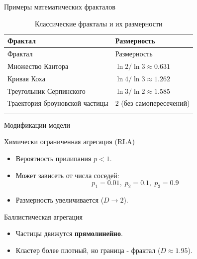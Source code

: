 \documentclass[
  ignorenonframetext,
  aspectratio=169,
  russian,
]{beamer}
\providecommand{\tightlist}{%
  \setlength{\itemsep}{0pt}\setlength{\parskip}{0pt}}
\begin{document}
\begin{frame}{Примеры математических фракталов}
\label{ux43fux440ux438ux43cux435ux440ux44b-ux43cux430ux442ux435ux43cux430ux442ux438ux447ux435ux441ux43aux438ux445-ux444ux440ux430ux43aux442ux430ux43bux43eux432}
\begin{longtable}[]{@{}ll@{}}
\caption{Классические фракталы и их
размерности}\label{tbl-classical-fractals}\tabularnewline
\toprule\noalign{}
Фрактал & Размерность \\
\midrule\noalign{}
\endfirsthead
\toprule\noalign{}
Фрактал & Размерность \\
\midrule\noalign{}
\endhead
Множество Кантора & \(\ln 2 / \ln 3 \approx 0.631\) \\
Кривая Коха & \(\ln 4 / \ln 3 \approx 1.262\) \\
Треугольник Серпинского & \(\ln 3 / \ln 2 \approx 1.585\) \\
Траектория броуновской частицы & \(2\) (без самопересечений) \\
\bottomrule\noalign{}
\end{longtable}
\end{frame}

\begin{frame}{Модификации модели}
\label{ux43cux43eux434ux438ux444ux438ux43aux430ux446ux438ux438-ux43cux43eux434ux435ux43bux438}
\begin{block}{Химически ограниченная агрегация (RLA)}
\label{ux445ux438ux43cux438ux447ux435ux441ux43aux438-ux43eux433ux440ux430ux43dux438ux447ux435ux43dux43dux430ux44f-ux430ux433ux440ux435ux433ux430ux446ux438ux44f-rla}
\begin{itemize}[<+->]
\tightlist
\item
  Вероятность прилипания \(p < 1\).
\item
  Может зависеть от числа соседей: \[
  p_1 = 0.01,\; p_2 = 0.1,\; p_3 = 0.9
  \]
\item
  Размерность увеличивается (\(D \to 2\)).
\end{itemize}
\end{block}

\begin{block}{Баллистическая агрегация}
\label{ux431ux430ux43bux43bux438ux441ux442ux438ux447ux435ux441ux43aux430ux44f-ux430ux433ux440ux435ux433ux430ux446ux438ux44f}
\begin{itemize}[<+->]
\tightlist
\item
  Частицы движутся \textbf{прямолинейно}.
\item
  Кластер более плотный, но граница - фрактал (\(D \approx 1.95\)).
\end{itemize}
\end{block}
\end{frame}
\end{document}
